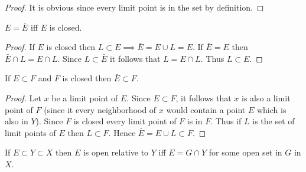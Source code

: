 \begin{proof}
  It is obvious since every limit point is in the set by definition.
\end{proof}
\begin{proposition}
  $E=\bar{E}$ iff $E$ is closed.
\end{proposition}
\begin{proof}
  If $E$ is closed then $L\subset E \implies \bar{E} = E\cup L = E$. If $\bar{E} = E$ then $\bar{E}\cap L = E\cap L$. Since $L\subset \bar{E}$ it follows that $L = E\cap L$. Thus $L\subset E$.
\end{proof}
\begin{proposition}
  If $E\subset F$ and $F$ is closed then $\bar{E} \subset F$.
\end{proposition}
\begin{proof}
  Let $x$ be a limit point of $E$. Since $E\subset F$, it follows that $x$ is also a limit point of $F$ (since it every neighborhood of $x$ would contain a point $E$ which is also in $Y$). Since $F$ is closed every limit point of $F$ is in $F$. Thus if $L$ is the set of limit points of $E$ then $L\subset F$. Hence $\bar{E} = E\cup L \subset F$.
\end{proof}
\begin{proposition}
  If $E\subset Y\subset X$ then $E$ is open relative to $Y$ iff $E = G\cap Y$ for some open set in $G$ in $X$.
\end{proposition}
